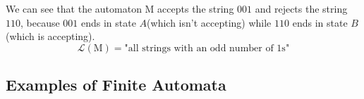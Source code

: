 \documentclass[11pt]{article}
\begin{document}
\begin{itemize}
\begin{itemize}
\begin{table}[H]
\begin{center}
    \end{center}
    \end{table}
    \end{itemize}
    We can see that the automaton M accepts the string $001$ and rejects the string $110$, because $001$ ends in state $A$(which isn't accepting) while $110$ ends in state $B$(which is accepting).
    $$\mathcal{L}\left(\text{M}\right)=\text{"all strings with an odd number of 1s"}$$
\end{itemize}



\subsection*{Examples of Finite Automata}
\end{document}

